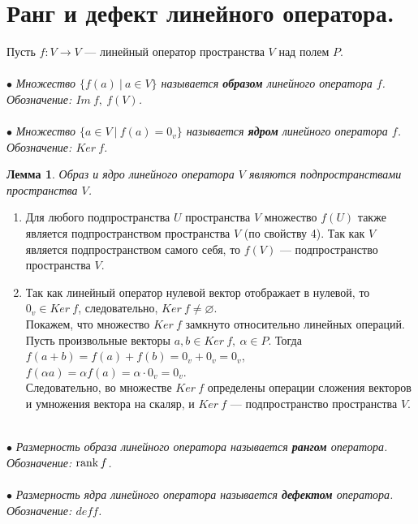 \section{Ранг и дефект линейного оператора.}
Пусть $f:V\rightarrow V$ --- линейный оператор пространства $V$ над полем $P$.\\\\
$\bullet$ \textit{Множество $\{f(a)\ |\ a\in V\}$ называется \textbf{образом} линейного оператора $f$. Обозначение: $Im\ f,\ f(V)$.}\\\\
$\bullet$ \textit{Множество $\{a\in V\ |\ f(a) = 0_v\}$ называется \textbf{ядром} линейного оператора $f$. Обозначение: $Ker\ f$.}
\newtheorem*{lem11_4_1}{Лемма}\begin{lem11_4_1}Образ и ядро линейного оператора $V$ являются подпространствами пространства $V$.
\end{lem11_4_1}
\begin{Proof}\begin{enumerate}
		\item Для любого подпространства $U$ пространства $V$ множество $f(U)$ также является подпространством пространства $V$ (по свойству 4). Так как $V$ является подпространством самого себя, то $f(V)$ --- подпространство пространства $V$.
		\item Так как линейный оператор нулевой вектор отображает в нулевой, то $0_v \in Ker\ f$, следовательно, $Ker\ f \ne \varnothing$.\\
		Покажем, что множество $Ker\ f$ замкнуто относительно линейных операций. Пусть произвольные векторы $a, b \in Ker\ f,\ \alpha \in P.$ Тогда\\
		$f(a+b) = f(a) + f(b) = 0_v + 0_v = 0_v$,\\
		$f(\alpha a) = \alpha  f(a) = \alpha \cdot 0_v = 0_v$.\\ Следовательно, во множестве $Ker\ f$ определены операции сложения векторов и умножения вектора на скаляр, и $Ker\ f$ --- подпространство пространства $V$.
	\end{enumerate}
\end{Proof}\\
$\bullet$ \textit{Размерность образа линейного оператора называется \textbf{рангом} оператора. Обозначение: $\operatorname{rank}  f$.}\\\\
$\bullet$ \textit{Размерность ядра линейного оператора называется \textbf{дефектом} оператора. Обозначение: $def f$.}
